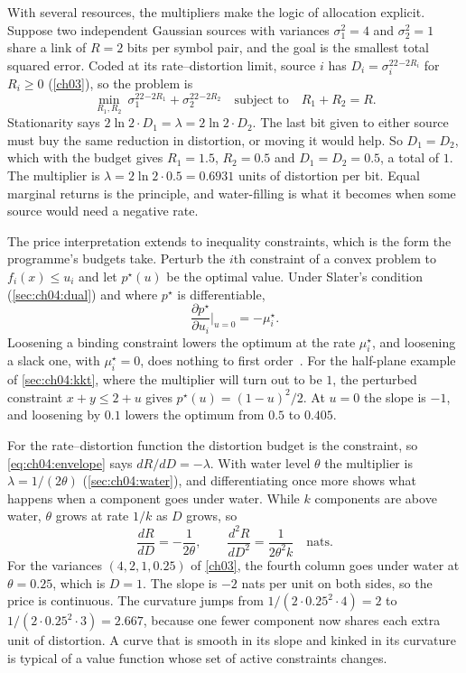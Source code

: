 With several resources, the multipliers make the logic of allocation explicit. Suppose two independent Gaussian sources with variances $\sigma_1^2=4$ and $\sigma_2^2=1$ share a link of $R=2$ bits per symbol pair, and the goal is the smallest total squared error. Coded at its rate--distortion limit, source $i$ has $D_i=\sigma_i^22^{-2R_i}$ for $R_i\ge0$ (\cref{ch03}), so the problem is
\begin{equation}\label{eq:ch04:two-sources}
\min_{R_1,R_2}\ \sigma_1^22^{-2R_1}+\sigma_2^22^{-2R_2}\quad\text{subject to}\quad R_1+R_2=R .
\end{equation}
Stationarity says $2\ln2\cdot D_1=\lambda=2\ln2\cdot D_2$. The last bit given to either source must buy the same reduction in distortion, or moving it would help. So $D_1=D_2$, which with the budget gives $R_1=1.5$, $R_2=0.5$ and $D_1=D_2=0.5$, a total of $1$. The multiplier is $\lambda=2\ln2\cdot0.5=0.6931$ units of distortion per bit. Equal marginal returns is the principle, and water-filling is what it becomes when some source would need a negative rate.

The price interpretation extends to inequality constraints, which is the form the programme's budgets take. Perturb the $i$th constraint of a convex problem to $f_i(x)\le u_i$ and let $p^\star(u)$ be the optimal value. Under Slater's condition (\cref{sec:ch04:dual}) and where $p^\star$ is differentiable,
\begin{equation}\label{eq:ch04:envelope}
\frac{\partial p^\star}{\partial u_i}\Big|_{u=0}=-\mu_i^\star .
\end{equation}
Loosening a binding constraint lowers the optimum at the rate $\mu_i^\star$, and loosening a slack one, with $\mu_i^\star=0$, does nothing to first order~\cite{boydvandenberghe2004}. For the half-plane example of \cref{sec:ch04:kkt}, where the multiplier will turn out to be $1$, the perturbed constraint $x+y\le2+u$ gives $p^\star(u)=(1-u)^2/2$. At $u=0$ the slope is $-1$, and loosening by $0.1$ lowers the optimum from $0.5$ to $0.405$.

For the rate--distortion function the distortion budget is the constraint, so \eqref{eq:ch04:envelope} says $dR/dD=-\lambda$. With water level $\theta$ the multiplier is $\lambda=1/(2\theta)$ (\cref{sec:ch04:water}), and differentiating once more shows what happens when a component goes under water. While $k$ components are above water, $\theta$ grows at rate $1/k$ as $D$ grows, so
\begin{equation}\label{eq:ch04:rd-curvature}
\frac{dR}{dD}=-\frac{1}{2\theta},\qquad \frac{d^2R}{dD^2}=\frac{1}{2\theta^2k}\quad\text{nats}.
\end{equation}
For the variances $(4,2,1,0.25)$ of \cref{ch03}, the fourth column goes under water at $\theta=0.25$, which is $D=1$. The slope is $-2$ nats per unit on both sides, so the price is continuous. The curvature jumps from $1/(2\cdot0.25^2\cdot4)=2$ to $1/(2\cdot0.25^2\cdot3)=2.667$, because one fewer component now shares each extra unit of distortion. A curve that is smooth in its slope and kinked in its curvature is typical of a value function whose set of active constraints changes.


